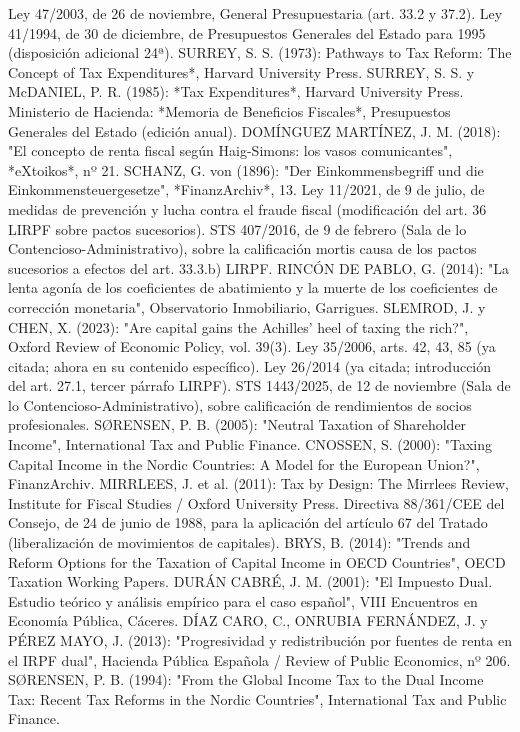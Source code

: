 \documentclass[10pt,a4paper]{article}
\begin{document}
Ley 47/2003, de 26 de noviembre, General Presupuestaria (art. 33.2 y 37.2).
Ley 41/1994, de 30 de diciembre, de Presupuestos Generales del Estado para 1995 (disposición adicional 24ª).
SURREY, S. S. (1973): Pathways to Tax Reform: The Concept of Tax Expenditures*, Harvard University Press.
SURREY, S. S. y McDANIEL, P. R. (1985): *Tax Expenditures*, Harvard University Press.
Ministerio de Hacienda: *Memoria de Beneficios Fiscales*, Presupuestos Generales del Estado (edición anual).
DOMÍNGUEZ MARTÍNEZ, J. M. (2018): "El concepto de renta fiscal según Haig-Simons: los vasos comunicantes", *eXtoikos*, nº 21.
SCHANZ, G. von (1896): "Der Einkommensbegriff und die Einkommensteuergesetze", *FinanzArchiv*, 13.
Ley 11/2021, de 9 de julio, de medidas de prevención y lucha contra el fraude fiscal (modificación del art. 36 LIRPF sobre pactos sucesorios).
STS 407/2016, de 9 de febrero (Sala de lo Contencioso-Administrativo), sobre la calificación mortis causa de los pactos sucesorios a efectos del art. 33.3.b) LIRPF.
RINCÓN DE PABLO, G. (2014): "La lenta agonía de los coeficientes de abatimiento y la muerte de los coeficientes de corrección monetaria", Observatorio Inmobiliario, Garrigues.
SLEMROD, J. y CHEN, X. (2023): "Are capital gains the Achilles' heel of taxing the rich?", Oxford Review of Economic Policy, vol. 39(3).
Ley 35/2006, arts. 42, 43, 85 (ya citada; ahora en su contenido específico).
Ley 26/2014 (ya citada; introducción del art. 27.1, tercer párrafo LIRPF).
STS 1443/2025, de 12 de noviembre (Sala de lo Contencioso-Administrativo), sobre calificación de rendimientos de socios profesionales.
SØRENSEN, P. B. (2005): "Neutral Taxation of Shareholder Income", International Tax and Public Finance.
CNOSSEN, S. (2000): "Taxing Capital Income in the Nordic Countries: A Model for the European Union?", FinanzArchiv.
MIRRLEES, J. et al. (2011): Tax by Design: The Mirrlees Review, Institute for Fiscal Studies / Oxford University Press.
Directiva 88/361/CEE del Consejo, de 24 de junio de 1988, para la aplicación del artículo 67 del Tratado (liberalización de movimientos de capitales).
BRYS, B. (2014): "Trends and Reform Options for the Taxation of Capital Income in OECD Countries", OECD Taxation Working Papers.
DURÁN CABRÉ, J. M. (2001): "El Impuesto Dual. Estudio teórico y análisis empírico para el caso español", VIII Encuentros en Economía Pública, Cáceres.
DÍAZ CARO, C., ONRUBIA FERNÁNDEZ, J. y PÉREZ MAYO, J. (2013): "Progresividad y redistribución por fuentes de renta en el IRPF dual", Hacienda Pública Española / Review of Public Economics, nº 206.
SØRENSEN, P. B. (1994): "From the Global Income Tax to the Dual Income Tax: Recent Tax Reforms in the Nordic Countries", International Tax and Public Finance.
\end{document}

